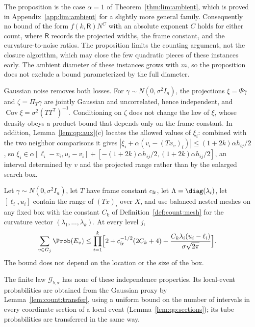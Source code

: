 The proposition is the case $\alpha=1$ of Theorem~\ref{thm:lim:ambient}, which
is proved in Appendix~\ref{app:lim:ambient} for a slightly more general
family. Consequently no bound of the form $f(k,\mathsf R)N^{C}$ with an
absolute exponent $C$ holds for either count, where $\mathsf R$ records the projected
widths, the frame constant, and the curvature-to-noise ratios. The proposition
limits the counting argument, not the closure algorithm, which may close the
few quadratic pieces of these instances early. The ambient diameter of these
instances grows with $m$, so the proposition does not exclude a bound
parameterized by the full diameter.

Gaussian noise removes both losses. For $\gamma\sim N(0,\sigma^2I_n)$, the
projections $\xi=\Psi\gamma$ and $\zeta=\Pi_T\gamma$ are jointly Gaussian and
uncorrelated, hence independent, and
$\operatorname{Cov}\xi=\sigma^2(TT^{\mathsf T})^{-1}$. Conditioning on $\zeta$ does not
change the law of $\xi$, whose density obeys a product bound that depends only
on the frame constant. In addition, Lemma~\ref{lem:qp:aux}(c) locates the
allowed values of $\xi_i$: combined with the two neighbor comparisons it
gives $|\xi_i+\alpha(v_i-(Tx_v)_i)|\le(1+2k)\alpha h_{ij}/2$, so
$\xi_i\in\alpha[\ell_i-v_i,u_i-v_i]+[-(1+2k)\alpha h_{ij}/2,(1+2k)\alpha h_{ij}/2]$,
an interval determined by $v$ and the projected range rather than by the
enlarged search box.

\begin{lemma}\label{lem:qp:gauss-count}
Let $\gamma\sim N(0,\sigma^2I_n)$, let $T$ have frame constant $c_{\rm fr}$,
let $\Lambda=\diag(\lambda_i)$, let $[\ell_i,u_i]$ contain the range of
$(Tx)_i$ over $X$, and use balanced nested meshes on any fixed box with the
constant $C_k$ of Definition~\ref{def:count:mesh} for the curvature vector
$(\lambda_1,\dots,\lambda_k)$. At every level $j$,
\[
 \sum_{v\in G_j}\Prob(E_v)\le\prod_{i=1}^k\Bigl[2+c_{\rm fr}^{-1/2}(2C_k+4)
 +\frac{C_k\lambda_i(u_i-\ell_i)}{\sigma\sqrt{2\pi}}\Bigr].
\]
The bound does not depend on the location or the size of the box.
\end{lemma}

The finite law $\mathcal G_{b,\sigma}$ has none of these independence
properties. Its local-event probabilities are obtained from the Gaussian
proxy by Lemma~\ref{lem:count:transfer}, using a uniform bound on the
number of intervals in every coordinate section of a local event
(Lemma~\ref{lem:qp:sections}); its tube probabilities are transferred in the
same way.

